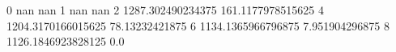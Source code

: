 0 nan nan
1 nan nan
2 1287.302490234375 161.1177978515625
4 1204.3170166015625 78.13232421875
6 1134.1365966796875 7.951904296875
8 1126.1846923828125 0.0
